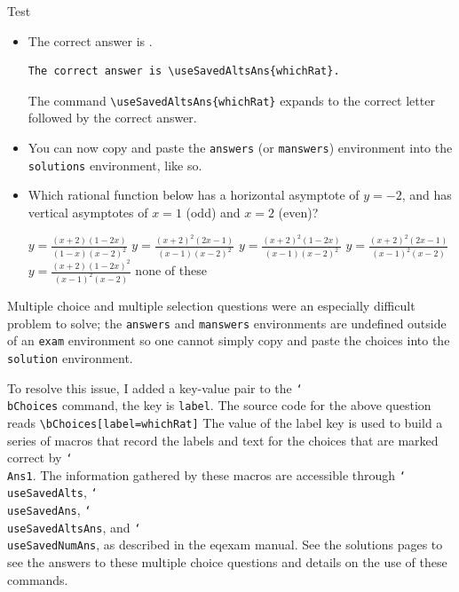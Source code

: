\documentclass{article}
\newcommand{\cs}[1]{\texttt{\char`\\#1}}
\begin{document}
\begin{exam}{Test\nExam}
\begin{theseproblems}
\begin{problem*}[2ea]
\begin{parts}
\begin{solution}[]
\begin{itemize}
\item The correct answer is .
\begin{verbatim}
The correct answer is \useSavedAltsAns{whichRat}.
\end{verbatim}
The command \verb!\useSavedAltsAns{whichRat}! expands to the correct
letter followed by the correct answer.
\item You can  now copy and paste the \texttt{answers} (or \texttt{manswers})
      environment into the \texttt{solutions} environment, like so.

\item[] Which rational function below has a horizontal asymptote of
    $y=-2$, and has vertical asymptotes of $x=1$ (odd) and $ x=2 $ (even)?
    \begin{answers}{3}\rowsep{6pt}
    \bChoices[label=whichRat]
         $ y = \frac{(x+2) (1-2x)}{(1-x)(x-2)^2} $\eAns
         $ y = \frac{(x+2)^2 (2x-1)}{(x-1)(x-2)^2} $\eAns
         $ y = \frac{(x+2)^2 (1-2x)}{(x-1)(x-2)^2} $\eAns
         $ y = \frac{(x+2)^2 (2x-1)}{(x-1)^2(x-2)} $\eAns
         $ y = \frac{(x+2) (1-2x)^2}{(x-1)^2(x-2)} $\eAns
         none of these\eAns
    \eChoices
    \end{answers}
\end{itemize}\fi
\end{solution}

\pushProblem
\begin{eqComments}[Comments:]
Multiple choice and multiple selection questions were an especially
difficult problem to solve; the \texttt{answers} and \texttt{manswers}
environments are undefined outside of an \texttt{exam} environment so one
cannot simply copy and paste the choices into the \texttt{solution} environment.

To resolve this issue, I added a key-value pair to the \cs{bChoices} command,
the key is \texttt{label}. The source code for the above question reads
\verb!\bChoices[label=whichRat]! The value of the label key is used to
build a series of macros that record the labels and text for the choices
that are marked correct by \cs{Ans1}. The information gathered by these
macros are accessible through \cs{useSavedAlts}, \cs{useSavedAns},
\cs{useSavedAltsAns}, and \cs{useSavedNumAns}, as described in the \textsf{eqexam}
manual. See the solutions pages to see the answers to these multiple
choice questions and details on the use of these commands.
\end{eqComments}
\popProblem


\end{parts}
\end{problem*}
\end{theseproblems}
\end{exam}
\end{document}
